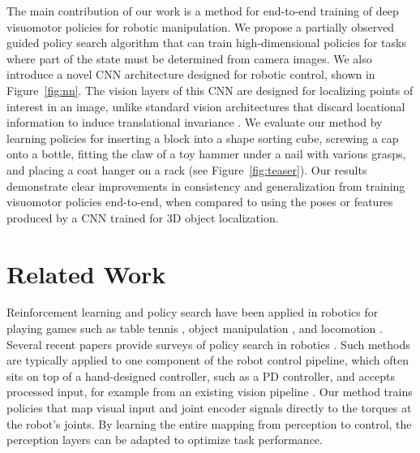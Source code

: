 \documentclass[conference]{IEEEtran}
\begin{document}
The main contribution of our work is a method for end-to-end training of deep visuomotor policies for robotic manipulation. We propose a partially observed guided policy search algorithm that can train high-dimensional policies for tasks where part of the state must be determined from camera images.
We also introduce a novel CNN architecture designed for robotic control, shown in Figure~\ref{fig:nn}. The vision layers of this CNN are designed for localizing points of interest in an image, unlike standard vision architectures that discard locational information to induce translational invariance \cite{ksh-incdc-12}. We evaluate our method by learning policies for inserting a block into a shape sorting cube, screwing a cap onto a bottle, fitting the claw of a toy hammer under a nail with various grasps, and placing a coat hanger on a rack (see Figure~\ref{fig:teaser}). Our results demonstrate clear improvements in consistency and generalization from training visuomotor policies end-to-end, when compared to using the poses or features produced by a CNN trained for 3D object localization.

\section{Related Work}
\label{sec:related}

Reinforcement learning and policy search have been applied in robotics for playing games such as table tennis \cite{kop-rlarm-10}, object manipulation \cite{drf-lclcm-11,phas-lgmsl-09}, and locomotion \cite{emmnc-lcbbl-08,gpw-fbwrc-06,kp-pgrlf-04,tzs-spgrl-04}. Several recent papers provide surveys of policy search in robotics \cite{dnp-spsr-13,kbp-rlrs-13}. Such methods are typically applied to one component of the robot control pipeline, which often sits on top of a hand-designed controller, such as a PD controller, and accepts processed input, for example from an existing vision pipeline \cite{phas-lgmsl-09}. Our method trains policies that map visual input and joint encoder signals directly to the torques at the robot's joints. By learning the entire mapping from perception to control, the perception layers can be adapted to optimize task performance.
\end{document}
